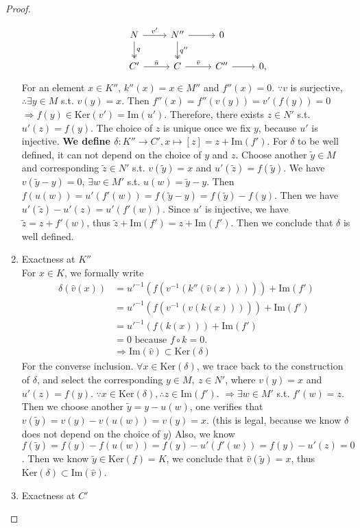 \documentclass[11pt]{article}
\newcommand{\Lrta}{\Longrightarrow}
\newcommand{\lrta}{\longrightarrow}
\begin{document}
\begin{proof}
\begin{enumerate}
\[\begin{tikzcd}
& N\arrow[r,"v'"] \arrow[d,"q",two heads]
& N''\arrow[r]\arrow[d,"q''",two heads]  
& 0 
\\
& C'  \arrow[r,"\bar{u}"] 
& C\arrow[r,"\bar{v}"] 
& C''\arrow[r]  
& 0,
\end{tikzcd}
\]
For an element $x\in K''$, $k''(x)=x\in M''$ and $f''(x)=0$. $\because v$ is surjective, $\therefore \exists y\in M $ s.t. $v(y)=x$. Then $f''(x)=f''(v(y))=v'(f(y))=0$ $\Lrta f(y)\in \text{Ker}(v')=\text{Im}(u')$. Therefore, there exists $z\in N'$ s.t. $u'(z)=f(y)$. The choice of $z$ is unique once we fix $y$, because $u'$ is injective. \textbf{We define $\delta:K''\lrta C', x\mapsto [z]=z+\text{Im}(f')$}. For $\delta$ to be well defined, it can not depend on the choice of $y$ and $z$. Choose another $\tilde{y}\in M$ and corresponding $\tilde{z}\in N'$ s.t. $v(\tilde{y})=x$ and $u'(\tilde{z})=f(\tilde{y})$. We have $v(\tilde{y}-y)=0$, $\exists w\in M'$ s.t. $u(w)=\tilde{y}-y$. Then $f(u(w))=u'(f'(w))=f(\tilde{y}-y)=f(\tilde{y})-f(y)$. Then we have $u'(\tilde{z})-u'(z)=u'(f'(w))$. Since $u'$ is injective, we have $\tilde{z}=z+f'(w)$, thus $\tilde{z}+\text{Im}(f')=z+\text{Im}(f')$.  Then we conclude that $\delta$ is well defined.
\item Exactness at $K''$\\
For $x\in K$, we formally write
$$
\begin{aligned}
\delta(\hat{v}(x))&=u'^{-1}(f(v^{-1}(k''(\hat{v}(x)))))+\text{Im}(f')\\
&=u'^{-1}(f(v^{-1}(v(k(x)))))+\text{Im}(f')\\
&=u'^{-1}(f(k(x)))+\text{Im}(f')\\
&=0 \text{ because } f\circ k=0.\\
&\Lrta \text{Im}(\hat{v})\subset \text{Ker}(\delta)
\end{aligned}
$$
For the converse inclusion. $\forall x\in \text{Ker}(\delta)$, we trace back to the construction of $\delta$, and select the corresponding $y\in M,\ z\in N'$, where $v(y)=x$ and $u'(z)=f(y)$. $\because x\in \text{Ker}(\delta),\therefore z\in \text{Im}(f')$. $\Lrta \exists w\in M'$ s.t. $f'(w)=z$. Then we choose another $\tilde{y}=y-u(w)$, one verifies that $v(\tilde{y})=v(y)-v(u(w))=v(y)=x$. (this is legal, because we know $\delta$ does not depend on the choice of $y$) Also, we know $f(\tilde{y})=f(y)-f(u(w))=f(y)-u'(f'(w))=f(y)-u'(z)=0$. Then we know $\tilde{y}\in \text{Ker}(f)=K$, we conclude that $\hat{v}(\tilde{y})=x$, thus $\text{Ker}(\delta)\subset \text{Im}(\hat{v})$.
\item Exactness at $C'$\\

\end{enumerate}
\end{proof}
\end{document}
